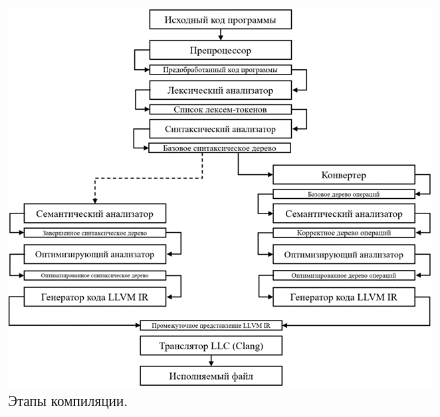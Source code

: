 \begin{figure}[h]
    \centering
    \includegraphics[width=\textwidth]{images/compilation-pipeline.png}
    \caption{Этапы компиляции.}
\end{figure}
